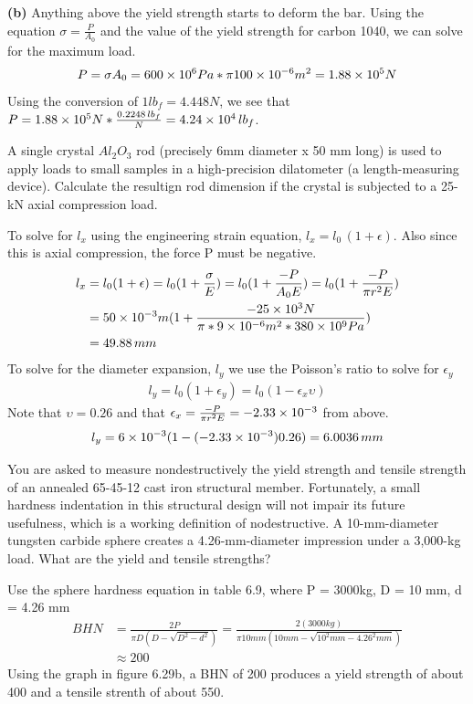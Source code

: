 \documentclass[12pt]{article}
\newenvironment{problem}[2][Problem]{\begin{trivlist}
\item[\hskip \labelsep {\bfseries #1}\hskip \labelsep {\bfseries #2.}]}{\end{trivlist}}
\begin{document}
\textbf{(b)} Anything above the yield strength starts to deform the bar. Using the equation $\sigma = \frac{P}{A_0}$ and the value of the yield strength for carbon 1040, we can solve for the maximum load.
\begin{align*}
P = \sigma A_0 = 600 \times 10^{6} Pa * \pi 100 \times 10^{-6} m^2 = 1.88 \times 10^{5} N
\end{align*}
Using the conversion of $1 lb_f = 4.448 N$, we see that $P = 1.88 \times 10^{5} N * \frac{0.2248 \, lb_f}{N} = 4.24 \times 10^{4}\, lb_f$.

\begin{problem}{6.16}
A single crystal $Al_2O_3$ rod (precisely 6mm diameter x 50 mm long) is used to apply loads to small samples in a high-precision dilatometer (a length-measuring device). Calculate the resultign rod dimension if the crystal is subjected to a 25-kN axial compression load.
\end{problem}

To solve for $l_x$ using the engineering strain equation, $l_x = l_0\,(1 + \epsilon)$. Also since this is axial compression, the force P must be negative.
\begin{align*}
l_x & = l_0 (1 + \epsilon) = l_0 (1 + \frac{\sigma}{E}) = l_0 (1 + \frac{-P}{A_0 E}) = l_0 (1 + \frac{-P}{\pi r^2 E}) \\ 
& = 50 \times 10^{-3}m (1 + \frac{-25 \times 10^{3} N}{\pi * 9 \times 10^{-6}m^2 * 380 \times 10^{9} Pa}) \\
& = 49.88 \, mm
\end{align*}
To solve for the diameter expansion, $l_y$ we use the Poisson's ratio to solve for $\epsilon_y$
\begin{align*}
l_y = l_0 (1 + \epsilon_y) = l_0 (1 - \epsilon_x \upsilon)
\end{align*}
Note that $\upsilon = 0.26$ and that $\epsilon_x = \frac{-P}{\pi r^2 E} = -2.33 \times 10^{-3}$ from above.
\begin{align*}
l_y = 6 \times 10^{-3}(1 - (-2.33 \times 10^{-3})0.26) = 6.0036 \, mm
\end{align*}

\begin{problem}{6.45}
You are asked to measure nondestructively the yield strength and tensile strength of an annealed 65-45-12 cast iron structural member. Fortunately, a small hardness indentation in this structural design will not impair its future usefulness, which is a working definition of nodestructive. A 10-mm-diameter tungsten carbide sphere creates a 4.26-mm-diameter impression under a 3,000-kg load. What are the yield and tensile strengths?
\end{problem}

Use the sphere hardness equation in table 6.9, where P = 3000kg, D = 10 mm, d = 4.26 mm
\begin{align*}
BHN & = \frac{2P}{\pi D(D - \sqrt{D^2 - d^2})} = \frac{2(3000kg)}{\pi 10mm(10mm - \sqrt{10^2mm - 4.26^2mm})} \\
& \approx 200
\end{align*}
Using the graph in figure 6.29b, a BHN of 200 produces a yield strength of about 400 and a tensile strenth of about 550.
 
\end{document}
